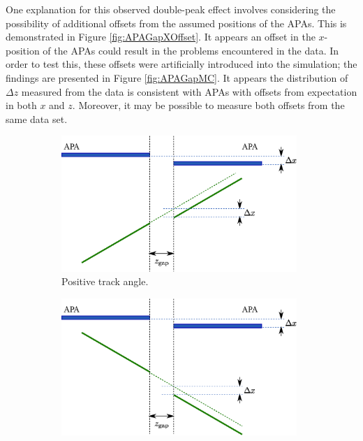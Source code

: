 One explanation for this observed double-peak effect involves considering the possibility of additional offsets from the assumed positions of the APAs.  This is demonstrated in Figure \ref{fig:APAGapXOffset}.  It appears an offset in the $x$-position of the APAs could result in the problems encountered in the data.  In order to test this, these offsets were artificially introduced into the simulation; the findings are presented in Figure \ref{fig:APAGapMC}.  It appears the distribution of $\Delta z$ measured from the data is consistent with APAs with offsets from expectation in both $x$ and $z$.  Moreover, it may be possible to measure both offsets from the same data set.

\begin{figure}[p]
  \centering
  \begin{subfigure}[t]{0.48\linewidth}
    \centering
    \includegraphics[width=0.98\textwidth]{apa_gap_xoffset_pos.eps}
    \caption{Positive track angle.}
    \label{fig:APAGapXOffsetPos}
  \end{subfigure}
  \hfill
  \begin{subfigure}[t]{0.48\linewidth}
    \centering
    \includegraphics[width=0.98\textwidth]{apa_gap_xoffset_neg.eps}

\end{subfigure}
\end{figure}
